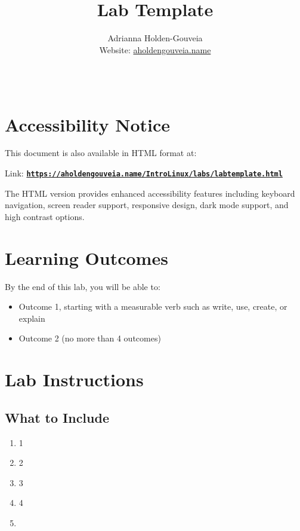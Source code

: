 \documentclass[12pt]{article}
\title{Lab Template}
\author{
        Adrianna Holden-Gouveia \\
        Website: \href{https://aholdengouveia.name}{aholdengouveia.name}\\ 
        \date{\vspace{-5ex}}
        \faGithub {: aholdengouveia} \\
        }
\begin{document}
    

\maketitle

\section*{Accessibility Notice}
This document is also available in HTML format at:

Link: \href{https://aholdengouveia.name/IntroLinux/labs/labtemplate.html}{\textbf{\nolinkurl{https://aholdengouveia.name/IntroLinux/labs/labtemplate.html}}}

The HTML version provides enhanced accessibility features including keyboard navigation, screen reader support, responsive design, dark mode support, and high contrast options.



\section*{Learning Outcomes}
By the end of this lab, you will be able to:
\begin{itemize}
    \item Outcome 1, starting with a measurable verb such as write, use, create, or explain
    \item Outcome 2 (no more than 4 outcomes)
\end{itemize}
\section*{Lab Instructions}


\subsection*{What to Include}
    \begin{enumerate}
        \item 1
        \item 2
        \item 3
        \item 4
        \item 


    \end{enumerate}
\end{document}
